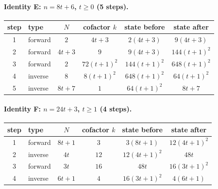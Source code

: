 \paragraph{Identity E: $n=8t+6$, $t\ge 0$ (5 steps).}
\begin{center}\footnotesize
\begin{tabular}{@{}clcccc@{}}\toprule
step & type & $N$ & cofactor $k$ & state before & state after \\ \midrule
1 & forward & $2$ & $4 t + 3$ & $2 \left(4 t + 3\right)$ & $9 \left(4 t + 3\right)$ \\
2 & forward & $4 t + 3$ & $9$ & $9 \left(4 t + 3\right)$ & $144 \left(t + 1\right)^{2}$ \\
3 & forward & $2$ & $72 \left(t + 1\right)^{2}$ & $144 \left(t + 1\right)^{2}$ & $648 \left(t + 1\right)^{2}$ \\
4 & inverse & $8$ & $8 \left(t + 1\right)^{2}$ & $648 \left(t + 1\right)^{2}$ & $64 \left(t + 1\right)^{2}$ \\
5 & inverse & $8 t + 7$ & $1$ & $64 \left(t + 1\right)^{2}$ & $8 t + 7$ \\
\bottomrule\end{tabular}\end{center}
\paragraph{Identity F: $n=24t+3$, $t\ge 1$ (4 steps).}
\begin{center}\footnotesize
\begin{tabular}{@{}clcccc@{}}\toprule
step & type & $N$ & cofactor $k$ & state before & state after \\ \midrule
1 & forward & $8 t + 1$ & $3$ & $3 \left(8 t + 1\right)$ & $12 \left(4 t + 1\right)^{2}$ \\
2 & inverse & $4 t$ & $12$ & $12 \left(4 t + 1\right)^{2}$ & $48 t$ \\
3 & forward & $3 t$ & $16$ & $48 t$ & $16 \left(3 t + 1\right)^{2}$ \\
4 & inverse & $6 t + 1$ & $4$ & $16 \left(3 t + 1\right)^{2}$ & $4 \left(6 t + 1\right)$ \\
\bottomrule\end{tabular}\end{center}
